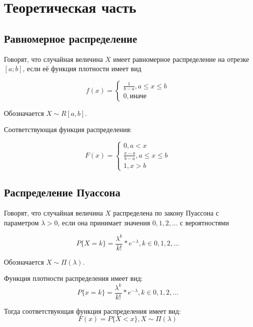 \chapter{Теоретическая часть}

\section{Равномерное распределение}

Говорят, что случайная величина \(X\) имеет равномерное распределение на отрезке \([a; b]\), если её функция плотности имеет вид

\begin{equation}
    f(x) = \begin{cases}
        \frac{1}{b - a}, a \le x \le b \\
        0, \text{иначе}
    \end{cases}
\end{equation}

Обозначается \(X \sim R[a, b] \).

Соответствующая функция распределения:

\begin{equation}
    F(x) = \begin{cases}
        0, a < x \\
        \frac{x - a}{b - a}, a \le x \le b \\
        1, x > b
    \end{cases}
\end{equation}

\section{Распределение Пуассона}

Говорят, что случайная величина \(X\) распределена по закону Пуассона с параметром \(\lambda > 0\), если она принимает значения \(0, 1, 2, \dots\) с вероятностями

\begin{equation}
    P\{X = k\} = \frac{\lambda^k}{k!}*e^{-\lambda}, k \in {0, 1, 2, \dots}
\end{equation}

Обозначается \(X \sim \Pi(\lambda)\).

Функция плотности распределения имеет вид:
\begin{equation}
    P\{x = k\} = \frac{\lambda^k}{k!}*e^{-\lambda}, k \in {0, 1, 2, \dots}
\end{equation}

Тогда соответствующая функция распределения имеет вид:
\begin{equation}
    F(x) = P\{X < x\}, X \sim \Pi(\lambda)
\end{equation}